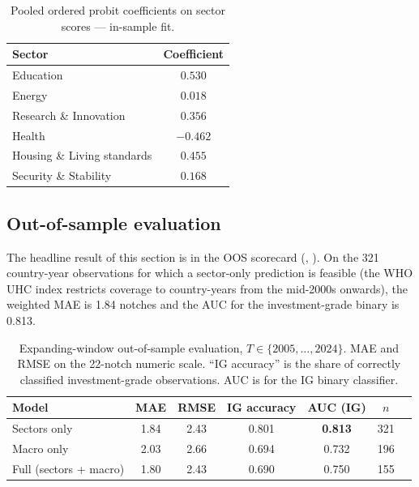 \begin{table}[h]
  \centering\small
  \begin{threeparttable}
  \caption{Pooled ordered probit coefficients on sector scores --- in-sample fit.}
  \label{tab:credit_coefs}
  \begin{tabular}{lc}
    \toprule
    Sector & Coefficient \\
    \midrule
    Education & $0.530$ \\
    Energy & $0.018$ \\
    Research \& Innovation & $0.356$ \\
    Health & $-0.462$ \\
    Housing \& Living standards & $0.455$ \\
    Security \& Stability & $0.168$ \\
    \bottomrule
  \end{tabular}
  \end{threeparttable}
\end{table}

\subsection{Out-of-sample evaluation}

The headline result of this section is in the OOS scorecard (, ). On the 321 country-year observations for which a sector-only prediction is feasible (the WHO UHC index restricts coverage to country-years from the mid-2000s onwards), the weighted MAE is 1.84 notches and the AUC for the investment-grade binary is 0.813.

\begin{table}[h]
  \centering\small
  \begin{threeparttable}
  \caption{Expanding-window out-of-sample evaluation, $T \in \{2005, \dots, 2024\}$. MAE and RMSE on the 22-notch numeric scale. ``IG accuracy'' is the share of correctly classified investment-grade observations. AUC is for the IG binary classifier.}
  \label{tab:credit_scorecard}
  \begin{tabular}{lcccccc}
    \toprule
    Model & MAE & RMSE & IG accuracy & AUC (IG) & $n$ \\
    \midrule
    Sectors only & 1.84 & 2.43 & 0.801 & \textbf{0.813} & 321 \\
    Macro only & 2.03 & 2.66 & 0.694 & 0.732 & 196 \\
    Full (sectors + macro) & 1.80 & 2.43 & 0.690 & 0.750 & 155 \\
    \bottomrule
  \end{tabular}
  \end{threeparttable}
\end{table}


